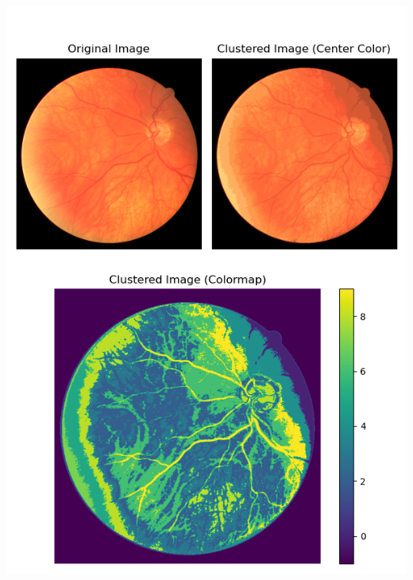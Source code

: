 \documentclass[12pt,letterpaper]{article}
\begin{document}
\begin{center}
    \includegraphics[scale=0.5]{Figures/2 10 Clusters.png}
\end{center}
\end{document}

